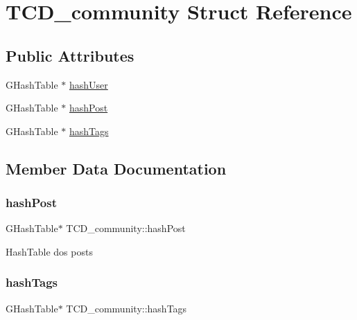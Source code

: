 \hypertarget{structTCD__community}{}\section{T\+C\+D\+\_\+community Struct Reference}
\label{structTCD__community}
\subsection*{Public Attributes}
\begin{DoxyCompactItemize}
\item 
G\+Hash\+Table $\ast$ \hyperlink{structTCD__community_ac7d27b6b20218509393b045cb0d544d8}{hash\+User}
\item 
G\+Hash\+Table $\ast$ \hyperlink{structTCD__community_ae86f74fcb11b48282812b25b825823b8}{hash\+Post}
\item 
G\+Hash\+Table $\ast$ \hyperlink{structTCD__community_a2ec07e1015bdb919665c1bc575f9aacd}{hash\+Tags}
\end{DoxyCompactItemize}


\subsection{Member Data Documentation}
\mbox{\label{structTCD__community_ae86f74fcb11b48282812b25b825823b8}} 
\subsubsection{\texorpdfstring{hash\+Post}{hashPost}}
{\footnotesize\ttfamily G\+Hash\+Table$\ast$ T\+C\+D\+\_\+community\+::hash\+Post}

Hash\+Table dos posts \mbox{\label{structTCD__community_a2ec07e1015bdb919665c1bc575f9aacd}} 
\subsubsection{\texorpdfstring{hash\+Tags}{hashTags}}
{\footnotesize\ttfamily G\+Hash\+Table$\ast$ T\+C\+D\+\_\+community\+::hash\+Tags}

